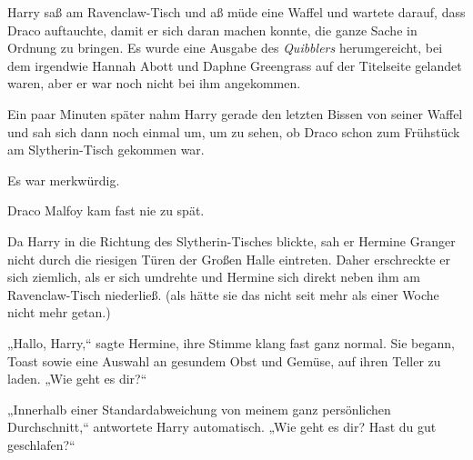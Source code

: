 Harry saß am Ravenclaw-Tisch und aß müde eine Waffel und wartete darauf, dass Draco auftauchte, damit er sich daran machen konnte, die ganze Sache in Ordnung zu bringen. Es wurde eine Ausgabe des \emph{Quibblers} herumgereicht, bei dem irgendwie Hannah Abott und Daphne Greengrass auf der Titelseite gelandet waren, aber er war noch nicht bei ihm angekommen.

Ein paar Minuten später nahm Harry gerade den letzten Bissen von seiner Waffel und sah sich dann noch einmal um, um zu sehen, ob Draco schon zum Frühstück am Slytherin-Tisch gekommen war.

Es war merkwürdig.

Draco Malfoy kam fast nie zu spät.

Da Harry in die Richtung des Slytherin-Tisches blickte, sah er Hermine Granger nicht durch die riesigen Türen der Großen Halle eintreten. Daher erschreckte er sich ziemlich, als er sich umdrehte und Hermine sich direkt neben ihm am Ravenclaw-Tisch niederließ. (als hätte sie das nicht seit mehr als einer Woche nicht mehr getan.)

„Hallo, Harry,“ sagte Hermine, ihre Stimme klang fast ganz normal. Sie begann, Toast sowie eine Auswahl an gesundem Obst und Gemüse, auf ihren Teller zu laden. „Wie geht es dir?“

„Innerhalb einer Standardabweichung von meinem ganz persönlichen Durchschnitt,“ antwortete Harry automatisch. „Wie geht es dir? Hast du gut geschlafen?“

